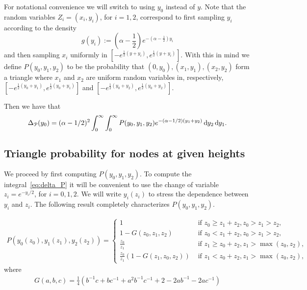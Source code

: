 For notational convenience we will switch to using $y_0$ instead of $y$. Note that the random variables $Z_i = (x_i,y_i)$, for $i = 1,2$, correspond to first sampling $y_i$ according to the density
\[
	g(y_i) := \left(\alpha -\frac{1}{2}\right) e^{-(\alpha-\frac{1}{2})y_i}
\] 
and then sampling $x_i$ uniformly in $[-e^{\frac{1}{2}(y+y_i)},e^{\frac{1}{2}(y+y_i)}]$. With this in mind we define $P(y_0,y_1,y_2)$ to be the probability that $(0,y_0), (x_1,y_1), (x_2,y_2)$ form a triangle where $x_1$ and $x_2$ are uniform random variables in, respectively, $[-e^{\frac{1}{2}(y_0+y_1)},e^{\frac{1}{2}(y_0+y_1)}]$ and  $[-e^{\frac{1}{2}(y_0+y_2)},e^{\frac{1}{2}(y_0+y_2)}]$.

Then we have that
\begin{align}\label{eq:delta_P}
 \Delta_{{\mathcal P}}(y_0) = (\alpha-1/2)^2 \int_0^\infty \int_0^\infty P(y_0, y_1, y_2) e^{-(\alpha-1/2)(y_1+y_2)} 
 \operatorname{\mathrm{d}\hspace{-2pt}} y_2 \operatorname{\mathrm{d}\hspace{-2pt}} y_1.
\end{align}

\subsection{Triangle probability for nodes at given heights}
We proceed by first computing $P(y_0,y_1,y_2)$. To compute the integral~\ref{eq:delta_P} it will be convenient to use the change of variable $z_i = e^{-y_i/2}$, for $i= 0, 1, 2$. We will write $y_i(z_i)$ to stress the dependence between $y_i$ and $z_i$. The following result completely characterizes $P(y_0,y_1,y_2)$.

\begin{lemma}\label{lem:triangle_prob_y_coordinates}
\begin{align*}
P(y_0(z_0),y_1(z_1),y_2(z_2)) = \begin{cases}
	1 &\text{ if } z_0 \geq z_1+z_2, z_0 > z_1 > z_2, \\
	1-G(z_0,z_1,z_2) &\text{ if } z_0 < z_1+z_2, z_0 > z_1 > z_2, \\
	\frac{z_0}{z_1} &\text{ if } z_1 \geq z_0+z_2, z_1 > \max(z_0,z_2), \\
	\frac{z_0}{z_1}\left(1-G(z_1,z_0,z_2)\right) &\text{ if } z_1 < z_0+z_2, z_1 > \max(z_0,z_2),
\end{cases}
\end{align*}
where 
\begin{align*}
G(a,b,c) = \frac{1}{4}
\left( b^{-1}c + bc^{-1} + a^2b^{-1}c^{-1} + 2 - 2ab^{-1}-2ac^{-1}\right)
\end{align*}
\end{lemma}


